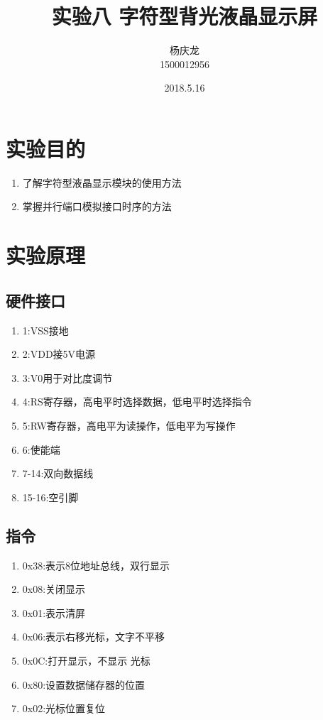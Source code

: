 \documentclass{article}
\begin{document}

\begin{CJK}{UTF8}{gkai}
\title{实验八 字符型背光液晶显示屏}
\author{杨庆龙 \\1500012956}
\date{2018.5.16}
\maketitle

\section{实验目的}
\begin{enumerate}
  \item 了解字符型液晶显示模块的使用方法
  \item 掌握并行端口模拟接口时序的方法
\end{enumerate}

\section{实验原理}
\subsection{硬件接口}
  \begin{enumerate}
    \item 1:VSS接地
    \item 2:VDD接5V电源
    \item 3:V0用于对比度调节
    \item 4:RS寄存器，高电平时选择数据，低电平时选择指令
    \item 5:RW寄存器，高电平为读操作，低电平为写操作
    \item 6:使能端
    \item 7-14:双向数据线
    \item 15-16:空引脚

  \end{enumerate}

\subsection{指令}
\begin{enumerate}
  \item 0x38:表示8位地址总线，双行显示
  \item 0x08:关闭显示
  \item 0x01:表示清屏
  \item 0x06:表示右移光标，文字不平移
  \item 0x0C:打开显示，不显示 光标
  \item 0x80:设置数据储存器的位置
  \item 0x02:光标位置复位
\end{enumerate}


\end{CJK}
\end{document}
